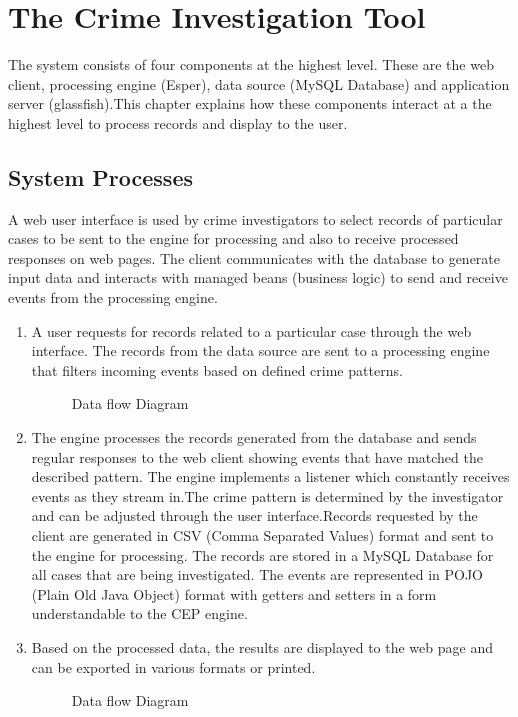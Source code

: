  
\section {The Crime Investigation Tool}

\noindent The system consists of four components at the highest level. These are the web client, processing engine (Esper), data source (MySQL Database) and application server (glassfish).This chapter explains how these components interact at a the highest level to process records and display to the user.

\subsection{System Processes}

\noindent A web user interface is used by crime investigators to select records of particular cases to be sent to the engine for processing and also to receive processed responses on web pages. The client communicates with the database to generate input data and interacts with managed beans (business logic) to send and receive events from the processing engine.
\begin{enumerate}

\item A user requests for records related to a particular case through the web interface. The records from the data source are sent to a processing engine that filters incoming events based on defined crime patterns.

\begin{center}
\begin{figure}[h]
\caption{Data flow Diagram}

\end{figure}
\end{center}


\item The engine processes the records generated from the database and sends regular responses to the web client showing events that have matched the described pattern. The engine implements a listener which constantly receives events as they stream in.The crime pattern is determined by the investigator and can be adjusted through the user interface.Records requested by the client are generated in CSV (Comma Separated Values) format and sent to the engine for processing. The records are stored in a MySQL Database for all cases that are being investigated. The events are represented in POJO (Plain Old Java Object) format with getters and setters in a form understandable to the CEP engine.

\item Based on the processed data, the results are displayed to the web page and can be exported in various formats or printed.

\begin{center}
\begin{figure}[h]
\caption{Data flow Diagram}

\end{figure}
\end{center}

\end{enumerate}
